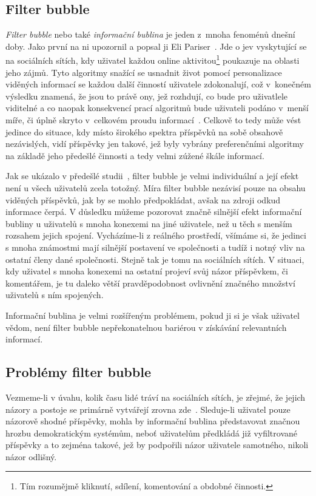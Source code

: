 \documentclass[12pt, a4paper]{article}
\numberwithin{equation}{section} 	%
\begin{document}
\subsection{Filter bubble}
\noindent \textit{Filter bubble} nebo také \textit{informační bublina} je jeden z mnoha fenoménů dnešní doby. Jako první na ni upozornil a popsal ji Eli Pariser~\cite{Pariser2011, PariserTed}. Jde o jev vyskytující se na sociálních sítích, kdy uživatel každou online aktivitou\footnote{Tím rozumějmě kliknutí, sdílení, komentování a obdobné činnosti.} poukazuje na oblasti jeho zájmů. Tyto algoritmy snažící se usnadnit život pomocí personalizace viděných informací se každou další činností uživatele zdokonalují, což v konečném výsledku znamená, že jsou to právě ony, jež rozhdují, co bude pro uživatlele viditelné a co naopak konsekvencí prací algoritmů bude uživateli podáno v menší míře, či úplně skryto v celkovém proudu informací~\cite{TheImpactOfFilterBubble}. Celkově to tedy může vést jedince do situace, kdy místo širokého spektra příspěvků na sobě obsahově nezávislých, vidí příspěvky jen takové, jež byly vybrány preferenčními algoritmy na základě jeho předešlé činnosti a tedy velmi zúžené škále informací.

Jak se ukázalo v předešlé studii~\cite{TheImpactOfFilterBubble}, filter bubble je velmi individuální a její efekt není u všech uživatelů zcela totožný. Míra filter bubble nezávisí pouze na obsahu viděných příspěvků, jak by se mohlo předpokládat, avšak na zdroji odkud informace čerpá. V důsledku můžeme pozorovat značně silnější efekt informační bubliny u uživatelů s mnoha konexemi na jiné uživatele, než u těch s menším rozsahem jejich spojení. Vycházíme-li z reálného prostředí, všímáme si, že jedinci s mnoha známostmi mají silnější postavení ve společnosti a tudíž i notný vliv na ostatní členy dané společnosti. Stejně tak je tomu na sociálních sítích. V situaci, kdy uživatel s mnoha konexemi na ostatní projeví svůj názor příspěvkem, či komentářem, je tu daleko větší pravděpodobnost ovlivnění značného množství uživatelů s ním spojených.

Informační bublina je velmi rozšířeným problémem, pokud ji si je však uživatel vědom, není filter bubble nepřekonatelnou bariérou v získávání relevantních informací.


\subsection{Problémy filter bubble}
Vezmeme-li v úvahu, kolik času lidé tráví na sociálních sítích, je zřejmé, že jejich názory a postoje se primárně vytvářejí zrovna zde~\cite{TheImpactOfFilterBubble, BeyondFilterBubble, whyNewsOnTwitter}. Sleduje-li uživatel pouze názorově shodné příspěvky, mohla by informační bublina představovat značnou hrozbu demokratickým systémům, neboť uživatelům předkládá již vyfiltrované příspěvky a to zejména takové, jež by podpořili názor uživatele samotného, nikoli názor odlišný.
\end{document}
